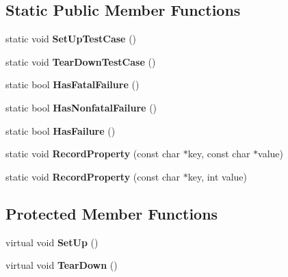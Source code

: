 \subsection*{Static Public Member Functions}
\begin{DoxyCompactItemize}
\item 
\mbox{\label{classtesting_1_1_test_a5ccbac42fee8c5b00b0bfe89b6c49d79}} 
static void {\bfseries Set\+Up\+Test\+Case} ()
\item 
\mbox{\label{classtesting_1_1_test_af374706cbaf0ffc460f4fd04e7c150f1}} 
static void {\bfseries Tear\+Down\+Test\+Case} ()
\item 
\mbox{\label{classtesting_1_1_test_aa8d0725cfb519f82eaf4fd2d2f46d97d}} 
static bool {\bfseries Has\+Fatal\+Failure} ()
\item 
\mbox{\label{classtesting_1_1_test_a3b933cea62eff67a05e23aa07f38bf29}} 
static bool {\bfseries Has\+Nonfatal\+Failure} ()
\item 
\mbox{\label{classtesting_1_1_test_a7a00be7dd0a6bfdc8d47a1b784623613}} 
static bool {\bfseries Has\+Failure} ()
\item 
\mbox{\label{classtesting_1_1_test_a6f025216c6540551ed4d3188384528fe}} 
static void {\bfseries Record\+Property} (const char $\ast$key, const char $\ast$value)
\item 
\mbox{\label{classtesting_1_1_test_a53653012476a8b697f64c46c5fbf2ace}} 
static void {\bfseries Record\+Property} (const char $\ast$key, int value)
\end{DoxyCompactItemize}
\subsection*{Protected Member Functions}
\begin{DoxyCompactItemize}
\item 
\mbox{\label{classtesting_1_1_test_a57a4116f39f6636a80710ded7d42e889}} 
virtual void {\bfseries Set\+Up} ()
\item 
\mbox{\label{classtesting_1_1_test_a2889fd829b6c712d98fb3896d28f64a3}} 
virtual void {\bfseries Tear\+Down} ()
\end{DoxyCompactItemize}

